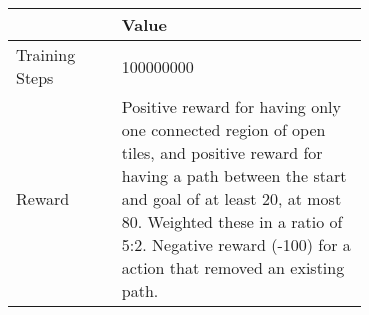 \begin{tabular}{lp{0.7\linewidth}}
\toprule
{} &                                                                                                                                                                                                                                                                  Value \\
\midrule
Training Steps &                                                                                                                                                                                                                                                              100000000 \\
Reward         &  Positive reward for having only one connected region of open tiles, and positive reward for having a path between the start and goal of at least 20, at most 80. Weighted these in a ratio of 5:2. Negative reward (-100) for a action that removed an existing path. \\
\bottomrule
\end{tabular}
